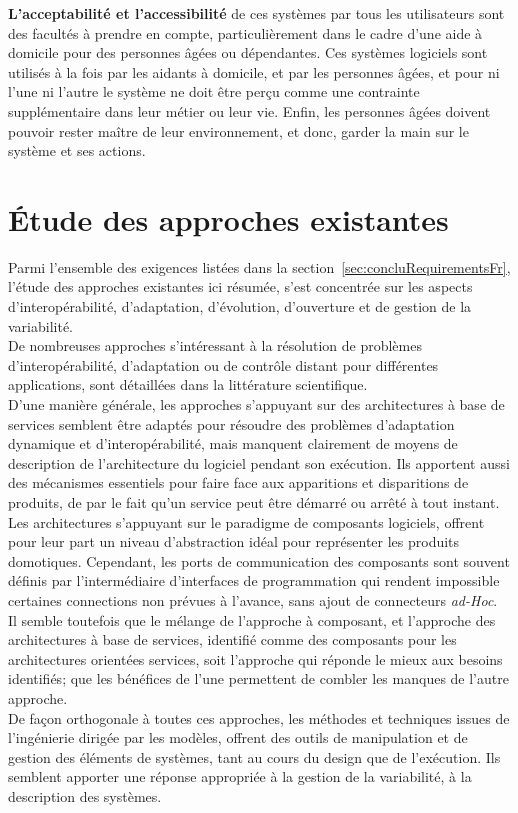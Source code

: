 {\bf L'acceptabilité et l'accessibilité} de ces systèmes par tous les utilisateurs sont des facultés à prendre en compte, particulièrement dans le cadre d'une aide à domicile pour des personnes âgées ou dépendantes. Ces systèmes logiciels sont utilisés à la fois par les aidants à domicile, et par les personnes âgées, et pour ni l'une ni l'autre le système ne doit être perçu comme une contrainte supplémentaire dans leur métier ou leur vie. Enfin, les personnes âgées doivent pouvoir rester maître de leur environnement, et donc, garder la main sur le système et ses actions.\\


\section{Étude des approches existantes}

Parmi l'ensemble des exigences listées dans la section~\ref{sec:concluRequirementsFr}, l'étude des approches existantes ici résumée, s'est concentrée sur les aspects d'interopérabilité, d'adaptation, d'évolution, d'ouverture et de gestion de la variabilité.\\

De nombreuses approches s'intéressant à la résolution de problèmes d'interopérabilité, d'adaptation ou de contrôle distant pour différentes applications, sont détaillées dans la littérature scientifique.\\
D'une manière générale, les approches s'appuyant sur des architectures à base de services semblent être adaptés pour résoudre des problèmes d'adaptation dynamique et d'interopérabilité, mais manquent clairement de moyens de description de l'architecture du logiciel pendant son exécution. Ils apportent aussi des mécanismes essentiels pour faire face aux apparitions et disparitions de produits, de par le fait qu'un service peut être démarré ou arrêté à tout instant.\\
Les architectures s'appuyant sur le paradigme de composants logiciels, offrent pour leur part un niveau d'abstraction idéal pour représenter les produits domotiques. Cependant, les ports de communication des composants sont souvent définis par l'intermédiaire d'interfaces de programmation qui rendent impossible certaines connections non prévues à l'avance, sans ajout de connecteurs {\it ad-Hoc}.\\
Il semble toutefois que le mélange de l'approche à composant, et l'approche des architectures à base de services, identifié comme des composants pour les architectures orientées services, soit l'approche qui réponde le mieux aux besoins identifiés; que les bénéfices de l'une permettent de combler les manques de l'autre approche.\\
De façon orthogonale à toutes ces approches, les méthodes et techniques issues de l'ingénierie dirigée par les modèles, offrent des outils de manipulation et de gestion des éléments de systèmes, tant au cours du design que de l'exécution. Ils semblent apporter une réponse appropriée à la gestion de la variabilité, à la description des systèmes.\\


